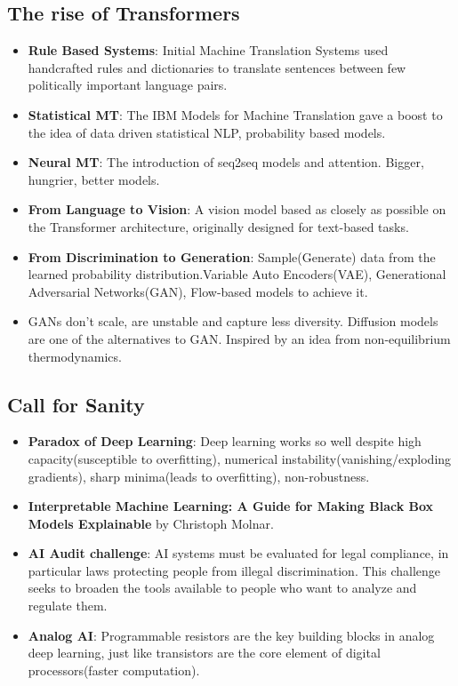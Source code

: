 \documentclass[a4paper]{article}
\begin{document}
\subsection{The rise of Transformers}
\begin{itemize}
    \item \textbf{Rule Based Systems}: Initial Machine Translation Systems used handcrafted rules and dictionaries to translate sentences between few politically important language pairs.
    \item \textbf{Statistical MT}: The IBM Models for Machine Translation gave a boost to the idea of data driven statistical NLP, probability based models.
    \item \textbf{Neural MT}: The introduction of seq2seq models and attention. Bigger, hungrier, better models.
    \item \textbf{From Language to Vision}: A vision model based as closely as possible on the Transformer architecture, originally designed for text-based tasks.
    \item \textbf{From Discrimination to Generation}: Sample(Generate) data from the learned probability distribution.Variable Auto Encoders(VAE), Generational Adversarial Networks(GAN), Flow-based models to achieve it.
    \item GANs don't scale, are unstable and capture less diversity. Diffusion models are one of the alternatives to GAN. Inspired by an idea from non-equilibrium thermodynamics.
\end{itemize}

\subsection{Call for Sanity}
\begin{itemize}
    \item \textbf{Paradox of Deep Learning}: Deep learning works so well despite high capacity(susceptible to overfitting), numerical instability(vanishing/exploding gradients), sharp minima(leads to overfitting), non-robustness.
    \item \textbf{Interpretable Machine Learning: A Guide for Making Black Box Models Explainable} by Christoph Molnar.
    \item \textbf{AI Audit challenge}: AI systems must be evaluated for legal compliance, in particular laws protecting people from illegal discrimination. This challenge seeks to broaden the tools available to people who want to analyze and regulate them.
    \item \textbf{Analog AI}: Programmable resistors are the key building blocks in analog deep learning, just like transistors are the core element of digital processors(faster computation).
\end{itemize}
\end{document}
